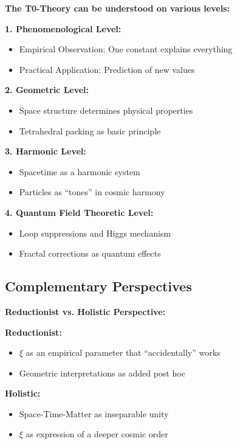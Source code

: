 \documentclass[12pt,a4paper]{article}
\newcommand{\xipar}{\xi}
\begin{document}
	\begin{foundation}
		\textbf{The T0-Theory can be understood on various levels:}
		
		\textbf{1. Phenomenological Level:}
		\begin{itemize}
			\item Empirical Observation: One constant explains everything
			\item Practical Application: Prediction of new values
		\end{itemize}
		
		\textbf{2. Geometric Level:}
		\begin{itemize}
			\item Space structure determines physical properties
			\item Tetrahedral packing as basic principle
		\end{itemize}
		
		\textbf{3. Harmonic Level:}
		\begin{itemize}
			\item Spacetime as a harmonic system
			\item Particles as ``tones'' in cosmic harmony
		\end{itemize}
		
		\textbf{4. Quantum Field Theoretic Level:}
		\begin{itemize}
			\item Loop suppressions and Higgs mechanism
			\item Fractal corrections as quantum effects
		\end{itemize}
	\end{foundation}
	
	\subsection{Complementary Perspectives}
	
	\begin{alternative}
		\textbf{Reductionist vs. Holistic Perspective:}
		
		\textbf{Reductionist:}
		\begin{itemize}
			\item $\xipar$ as an empirical parameter that ``accidentally'' works
			\item Geometric interpretations as added post hoc
		\end{itemize}
		
		\textbf{Holistic:}
		\begin{itemize}
			\item Space-Time-Matter as inseparable unity
			\item $\xipar$ as expression of a deeper cosmic order
		\end{itemize}
	\end{alternative}
	
\end{document}
